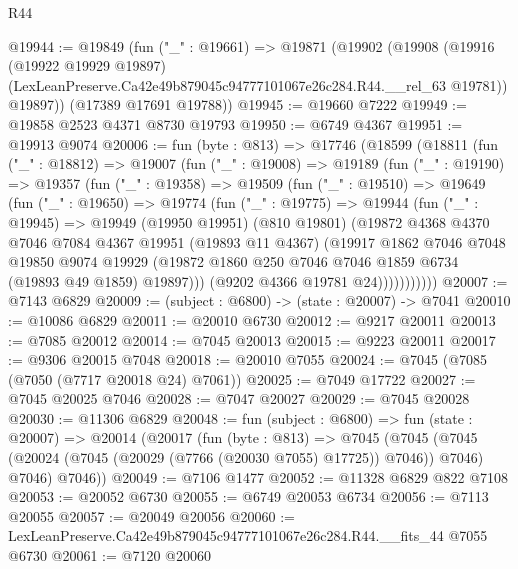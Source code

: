 \begin{lexlean}{R44}
\begin{coremodule}
{@19944 := @19849
    (fun ("_" : @19661) =>
    @19871
      (@19902
        (@19908
          (@19916
            (@19922 @19929 @19897)
            (LexLeanPreserve.Ca42e49b879045c94777101067e26c284.R44.__rel_63 @19781))
          @19897))
      (@17389 @17691 @19788))
@19945 := @19660 @7222
@19949 := @19858 @2523 @4371 @8730 @19793
@19950 := @6749 @4367
@19951 := @19913 @9074
@20006 := fun (byte : @813) =>
  @17746
    (@18599
      (@18811
        (fun ("_" : @18812) =>
        @19007
          (fun ("_" : @19008) =>
          @19189
            (fun ("_" : @19190) =>
            @19357
              (fun ("_" : @19358) =>
              @19509
                (fun ("_" : @19510) =>
                @19649
                  (fun ("_" : @19650) =>
                  @19774
                    (fun ("_" : @19775) =>
                    @19944
                      (fun ("_" : @19945) =>
                      @19949
                        (@19950 @19951)
                        (@810 @19801)
                        (@19872
                          @4368
                          @4370
                          @7046
                          @7084
                          @4367
                          @19951
                          (@19893 @11 @4367)
                          (@19917
                            @1862
                            @7046
                            @7048
                            @19850
                            @9074
                            @19929
                            (@19872 @1860 @250 @7046 @7046 @1859 @6734 (@19893 @49 @1859) @19897)))
                        (@9202 @4366 @19781 @24)))))))))))
@20007 := @7143 @6829
@20009 := (subject : @6800) -> (state : @20007) -> @7041
@20010 := @10086 @6829
@20011 := @20010 @6730
@20012 := @9217 @20011
@20013 := @7085 @20012
@20014 := @7045 @20013
@20015 := @9223 @20011
@20017 := @9306 @20015 @7048
@20018 := @20010 @7055
@20024 := @7045 (@7085 (@7050 (@7717 @20018 @24) @7061))
@20025 := @7049 @17722
@20027 := @7045 @20025 @7046
@20028 := @7047 @20027
@20029 := @7045 @20028
@20030 := @11306 @6829
@20048 := fun (subject : @6800) =>
  fun (state : @20007) =>
  @20014
    (@20017
      (fun (byte : @813) =>
      @7045
        (@7045 (@7045 (@20024 (@7045 (@20029 (@7766 (@20030 @7055) @17725)) @7046)) @7046) @7046)
        @7046))
@20049 := @7106 @1477
@20052 := @11328 @6829 @822 @7108
@20053 := @20052 @6730
@20055 := @6749 @20053 @6734
@20056 := @7113 @20055
@20057 := @20049 @20056
@20060 := LexLeanPreserve.Ca42e49b879045c94777101067e26c284.R44.__fits_44 @7055 @6730
@20061 := @7120 @20060
}
\end{coremodule}
\end{lexlean}
